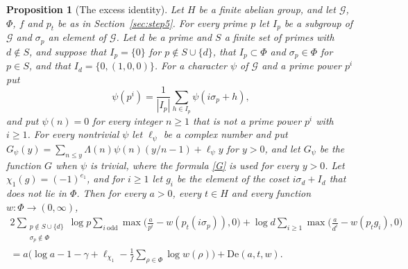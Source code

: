 \documentclass[11pt,letterpaper]{article}
\newtheorem{proposition}[theorem]{Proposition}
\numberwithin{equation}{section}
\begin{document}
\begin{proposition}[The excess identity]\label{excess}
Let $H$ be a finite abelian group, and let $\mathcal G$, $\Phi$, $f$ and $p_t$ be as in Section~\ref{sec:step5}. For every prime $p$ let $I_p$ be a subgroup of $\mathcal G$ and $\sigma_p$ an element of $\mathcal G$. Let $d$ be a prime and $S$ a finite set of primes with $d\notin S$, and suppose that $I_p=\{0\}$ for $p\notin S\cup\{d\}$, that $I_p\subset\Phi$ and $\sigma_p\in\Phi$ for $p\in S$, and that $I_d=\{0,(1,0,0)\}$. For a character $\psi$ of $\mathcal G$ and a prime power $p^i$ put
\[
\psi(p^i)=\frac1{|I_p|}\sum_{h\in I_p}\psi(i\sigma_p+h),
\]
and put $\psi(n)=0$ for every integer $n\ge1$ that is not a prime power $p^i$ with $i\ge1$. For every nontrivial $\psi$ let $\ell_\psi$ be a complex number and put $G_\psi(y)=\sum_{n\le y}\Lambda(n)\psi(n)(y/n-1)+\ell_\psi y$ for $y>0$, and let $G_\psi$ be the function $G$ when $\psi$ is trivial, where the formula \eqref{G} is used for every $y>0$. Let $\chi_1(g)=(-1)^{e_1}$, and for $i\ge1$ let $g_i$ be the element of the coset $i\sigma_d+I_d$ that does not lie in $\Phi$. Then for every $a>0$, every $t\in H$ and every function $w\colon\Phi\to(0,\infty)$,
\begin{multline*}
2\sum_{\substack{p\notin S\cup\{d\}\\ \sigma_p\notin\Phi}}\log p\sum_{i\ \mathrm{odd}}\max\Big(\frac a{p^i}-w(p_t(i\sigma_p)),0\Big)+\log d\sum_{i\ge1}\max\Big(\frac a{d^i}-w(p_tg_i),0\Big)\\
=a\Big(\log a-1-\gamma+\ell_{\chi_1}-\frac1f\sum_{\rho\in\Phi}\log w(\rho)\Big)+\mathrm{De}(a,t,w).
\end{multline*}
\end{proposition}
\end{document}

